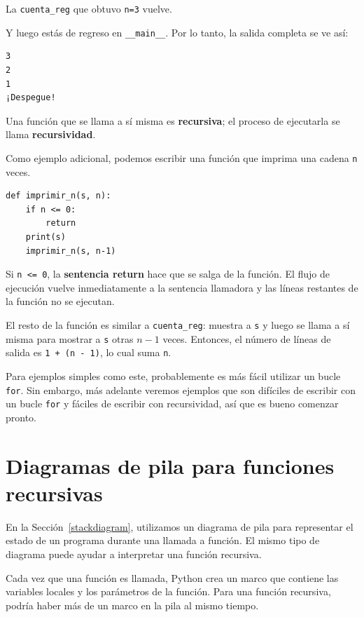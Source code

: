 \documentclass[10pt]{book}
\begin{document}
La {\tt cuenta\_reg} que obtuvo {\tt n=3} vuelve.

Y luego estás de regreso en \verb"__main__".  Por lo tanto, la
salida completa se ve así:

\begin{verbatim}
3
2
1
¡Despegue!
\end{verbatim}
%
Una función que se llama a sí misma es {\bf recursiva}; el proceso de
ejecutarla se llama {\bf recursividad}.

Como ejemplo adicional, podemos escribir una función que imprima una
cadena {\tt n} veces.

\begin{verbatim}
def imprimir_n(s, n):
    if n <= 0:
        return
    print(s)
    imprimir_n(s, n-1)
\end{verbatim}
%
Si {\tt n <= 0}, la {\bf sentencia return} hace que se salga de la función.  El
flujo de ejecución vuelve inmediatamente a la sentencia llamadora y las líneas restantes
de la función no se ejecutan.


El resto de la función es similar a {\tt cuenta\_reg}: muestra a
{\tt s} y luego se llama a sí misma para mostrar a {\tt s} otras $n-1$
veces.  Entonces, el número de líneas de salida es {\tt 1 + (n - 1)}, lo cual
suma {\tt n}.

Para ejemplos simples como este, probablemente es más fácil utilizar un bucle {\tt
for}.  Sin embargo, más adelante veremos ejemplos que son difíciles de escribir
con un bucle {\tt for} y fáciles de escribir con recursividad, así que es
bueno comenzar pronto.


\section{Diagramas de pila para funciones recursivas}
\label{recursive.stack}

En la Sección~\ref{stackdiagram}, utilizamos un diagrama de pila para representar
el estado de un programa durante una llamada a función.  El mismo tipo de
diagrama puede ayudar a interpretar una función recursiva.

Cada vez que una función es llamada, Python crea un
marco que contiene las variables locales y los parámetros de la función.
Para una función recursiva, podría haber más de un marco en la
pila al mismo tiempo.
\end{document}

